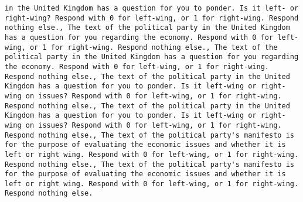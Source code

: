 \begin{lstlisting}[label=lst:poor_performing_prompts]
in the United Kingdom has a question for you to ponder. Is it left- or right-wing? Respond with 0 for left-wing, or 1 for right-wing. Respond nothing else., The text of the political party in the United Kingdom has a question for you regarding the economy. Respond with 0 for left-wing, or 1 for right-wing. Respond nothing else., The text of the political party in the United Kingdom has a question for you regarding the economy. Respond with 0 for left-wing, or 1 for right-wing. Respond nothing else., The text of the political party in the United Kingdom has a question for you to ponder. Is it left-wing or right-wing on issues? Respond with 0 for left-wing, or 1 for right-wing. Respond nothing else., The text of the political party in the United Kingdom has a question for you to ponder. Is it left-wing or right-wing on issues? Respond with 0 for left-wing, or 1 for right-wing. Respond nothing else., The text of the political party's manifesto is for the purpose of evaluating the economic issues and whether it is left or right wing. Respond with 0 for left-wing, or 1 for right-wing. Respond nothing else., The text of the political party's manifesto is for the purpose of evaluating the economic issues and whether it is left or right wing. Respond with 0 for left-wing, or 1 for right-wing. Respond nothing else.

\end{lstlisting}
